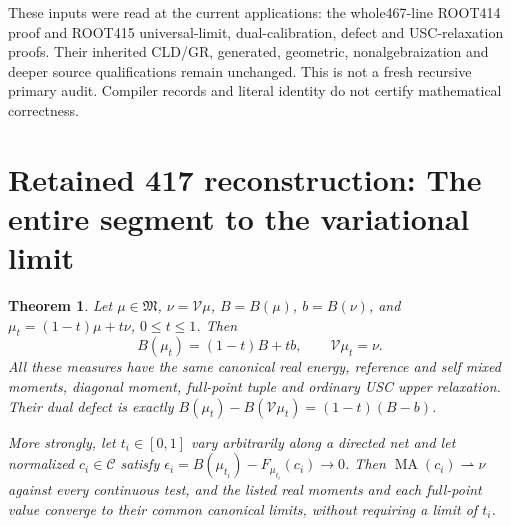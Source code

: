 \documentclass[11pt]{article}
\newtheorem{theorem}{Theorem}
\newcommand{\MA}{\operatorname{MA}}
\newcommand{\C}{\mathcal C}
\newcommand{\M}{\mathfrak M}
\newcommand{\V}{\mathcal V}
\begin{document}
These inputs were read at the current applications: the whole467-line
ROOT414 proof and ROOT415 universal-limit, dual-calibration, defect and
USC-relaxation proofs. Their inherited CLD/GR, generated, geometric,
nonalgebraization and deeper source qualifications remain unchanged.
This is not a fresh recursive primary audit. Compiler records and
literal identity do not certify mathematical correctness.

\section{Retained 417 reconstruction: The entire segment to the variational limit}
\begin{theorem}\label{ret417:ray}
Let $\mu\in\M$, $\nu=\V\mu$, $B=B(\mu)$, $b=B(\nu)$, and
$\mu_t=(1-t)\mu+t\nu$, $0\le t\le1$. Then
\[
 B(\mu_t)=(1-t)B+tb,\qquad \V\mu_t=\nu.
\]
All these measures have the same canonical real energy, reference and
self mixed moments, diagonal moment, full-point tuple and ordinary USC
upper relaxation. Their dual defect is exactly
$B(\mu_t)-B(\V\mu_t)=(1-t)(B-b)$.

More strongly, let $t_i\in[0,1]$ vary arbitrarily along a directed net
and let normalized $c_i\in\C$ satisfy
$\epsilon_i=B(\mu_{t_i})-F_{\mu_{t_i}}(c_i)\to0$.
Then $\MA(c_i)\rightharpoonup\nu$ against every continuous test,
and the listed real moments and each full-point value converge to
their common canonical limits, without requiring a limit of $t_i$.
\end{theorem}
\end{document}
